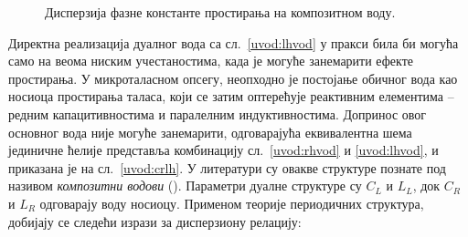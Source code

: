 \documentclass[main.tex]{subfiles}
\begin{document}
\begin{figure}[h]
    \centering
    \hfill
    \caption{Дисперзија фазне константе простирања на композитном воду.}
\end{figure}
Директна реализација дуалног вода са сл.~\ref{uvod:lhvod} у пракси била би могућа само на веома ниским учестаностима, када је могуће занемарити ефекте простирања. У микроталасном опсегу, неопходно је постојање обичног вода као носиоца простирања таласа, који се затим оптерећује реактивним елементима -- редним капацитивностима и паралелним индуктивностима. Допринос овог основног вода није могуће занемарити, одговарајућа еквивалентна шема јединичне ћелије представља комбинацију сл.~\ref{uvod:rhvod} и \ref{uvod:lhvod}, и приказана је на сл.~\ref{uvod:crlh}. У литератури су овакве структуре познате под називом \emph{композитни водови} (). Параметри дуалне структуре су $C_L$ и $L_L$, док $C_R$ и $L_R$ одговарају воду носиоцу. Применом теорије периодичних структура, добијају се следећи изрази за дисперзиону релацију:
\end{document}
